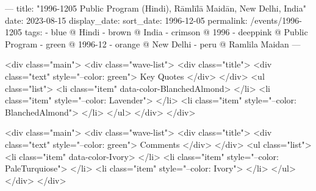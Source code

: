 ---
title: "1996-1205 Public Program (Hindi), Rāmlīlā Maidān, New Delhi, India"
date: 2023-08-15
display_date: 
sort_date: 1996-12-05
permalink: /events/1996-1205
tags:
  - blue @ Hindi
  - brown @ India
  - crimson @ 1996
  - deeppink @ Public Program
  - green @ 1996-12
  - orange @ New Delhi
  - peru @ Ramlila Maidan
---

<div class="main">
  <div class="wave-list">
    <div class="title">
      <div class="text" style="--color: green">
        Key Quotes
      </div>
    </div>
    <ul class="list">
        <li class="item" data-color-BlanchedAlmond>
        </li>
        <li class="item" style="--color: Lavender">
        </li>
        <li class="item" style="--color: BlanchedAlmond">
        </li>
      </ul>
  </div>
</div>

<div class="main">
  <div class="wave-list">
    <div class="title">
      <div class="text" style="--color: green">
        Comments
      </div>
    </div>
    <ul class="list">
        <li class="item" data-color-Ivory>
        </li>
        <li class="item" style="--color: PaleTurquiose">
        </li>
        <li class="item" style="--color: Ivory">
        </li>
      </ul>
  </div>
</div>